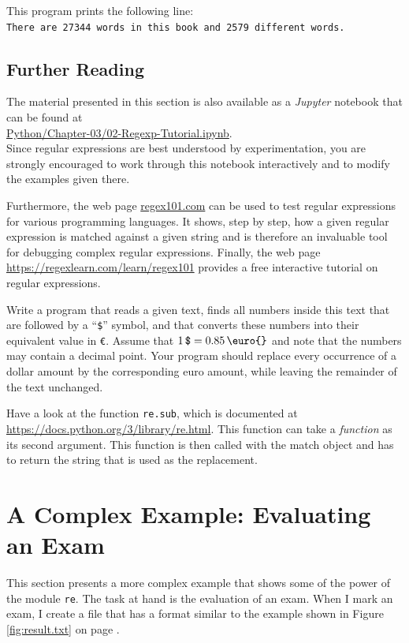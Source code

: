 \noindent
This program prints the following line:
\\[0.2cm]
\hspace*{1.3cm}
\texttt{There are 27344 words in this book and 2579 different words.}

\subsection{Further Reading}
The material presented in this section is also available as a \textsl{Jupyter} notebook that can be found at
\\[0.2cm]
\hspace*{1.3cm}
\href{https://github.com/karlstroetmann/Formal-Languages/blob/master/Python/Chapter-03/02-Regexp-Tutorial.ipynb}{Python/Chapter-03/02-Regexp-Tutorial.ipynb}.
\\[0.2cm]
Since regular expressions are best understood by experimentation, you are strongly encouraged to work through
this notebook interactively and to modify the examples given there.

Furthermore, the web page \href{https://regex101.com}{regex101.com} can be used to test regular expressions for
various programming languages.  It shows, step by step, how a given regular expression is matched against a
given string and is therefore an invaluable tool for debugging complex regular expressions.  Finally, the web
page \href{https://regexlearn.com/learn/regex101}{https://regexlearn.com/learn/regex101} provides a free
interactive tutorial on regular expressions.

\exerciseEng\label{exercise:dollar-to-euro}
Write a program that reads a given text, finds all numbers inside this text that are followed by a
``\texttt{\$}'' symbol, and that converts these numbers into their equivalent value in \texttt{\euro{}}.  Assume
that $1\,\texttt{\$} = 0.85\,\texttt{\euro{}}$ and note that the numbers may contain a decimal point.  Your
program should replace every occurrence of a dollar amount by the corresponding euro amount, while leaving the
remainder of the text unchanged.

\hint
Have a look at the function \texttt{re.sub}, which is documented at
\url{https://docs.python.org/3/library/re.html}.  This function can
take a \emph{function} as its second argument.  This function is then called with the match object and has to
return the string that is used as the replacement.
\eox

\section{A Complex Example: Evaluating an Exam \label{section:exam}}
This section presents a more complex example that shows some of the power of the module \texttt{re}.  The task at
hand is the evaluation of an exam.  When I mark an exam, I create a file that has a format similar to the example
shown in Figure \ref{fig:result.txt} on page \pageref{fig:result.txt}.

